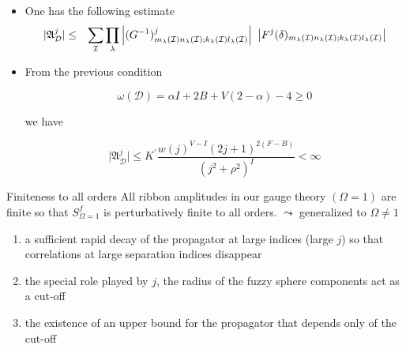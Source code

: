 \documentclass[9pt]{beamer}
\begin{document}
\begin{frame}

\begin{itemize}

\frametitle{Finiteness to all orders II}

\item One has the following estimate
%
\begin{eqnarray*}
\vert\mathfrak{A}^j_{\mathcal{D}}\vert &\le& \sum_{\mathcal{I}} \prod_\lambda \left|(G^{-1})^j_{m_\lambda(\mathcal{I}) n_\lambda(\mathcal{I}) ; k_\lambda(\mathcal{I}) l_\lambda(\mathcal{I})} \right| \ \left| F^j(\delta)_{m_\lambda({\cal{I}}) n_\lambda({\cal{I}});k_\lambda({\cal{I}}) l_\lambda({\cal{I}})} \right|
\end{eqnarray*}

\item From the previous condition

\begin{equation*}
\omega(\mathcal{D})=\alpha I+2B+V(2-\alpha)-4\ge0 
\end{equation*}

we have

\begin{equation*}
\vert\mathfrak{A}^j_{\mathcal{D}}\vert \le K^\prime\frac{w(j)^{V-I}(2j+1)^{2(F-B)}}{(j^2+\rho^2)^I}< \infty
\end{equation*}

\end{itemize}

\begin{block}{Finiteness to all orders}
All ribbon amplitudes in our gauge theory $\left(\Omega=1\right)$ are finite so that $S^f_{\Omega=1}$ is perturbatively finite to all orders. $\leadsto$ generalized to $\Omega \neq 1$
\end{block}

\begin{enumerate}
 \item a sufficient rapid decay of the propagator at large indices (large $j$) so that correlations at large separation indices disappear
\item the special role played by $j$, the radius of the fuzzy sphere components act as a cut-off
\item the existence of an upper bound for the propagator that depends only of the cut-off
\end{enumerate}

\end{frame}
\end{document}
